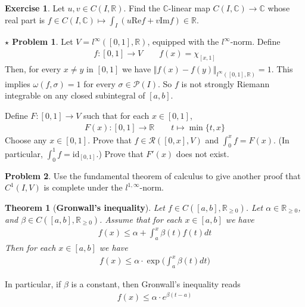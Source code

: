 \documentclass[12pt,b5paper,notitlepage]{article}
\theoremstyle{definition}
\newtheorem{exe}[df]{Exercise}
\newtheorem{prob}{\color{red}Problem}[section]
\newtheorem{sprob}[prob]{\color{red}$\star$ Problem}
\theoremstyle{plain}
\newtheorem{thm}[df]{Theorem}
\newcommand{\fk}{\mathfrak}
\newcommand{\mc}{\mathcal}
\newcommand{\id}{\mathrm{id}}
\newcommand{\scr}{\mathscr}
\newcommand{\Cbb}{\mathbb C}
\newcommand{\Rbb}{\mathbb R}
\newcommand{\Real}{\mathrm{Re}}
\newcommand{\Imag}{\mathrm{Im}}
\numberwithin{equation}{section}
\begin{document}
\begin{exe}
Let $u,v\in C(I,\Rbb)$. Find the $\Cbb$-linear map $C(I,\Cbb)\rightarrow\Cbb$ whose real part is $f\in C(I,\Cbb)\mapsto \int_I(u\Real f+v\Imag f)\in\Rbb$. 
\end{exe}



\begin{sprob}\label{lb389}
Let $V=l^\infty([0,1],\Rbb)$, equipped with the $l^\infty$-norm. Define 
\begin{align*}
f:[0,1]\rightarrow V\qquad f(x)=\chi_{[x,1]}
\end{align*}
Then, for every $x\neq y$ in $[0,1]$ we have $\Vert f(x)-f(y)\Vert_{l^\infty([0,1],\Rbb)}=1$. This implies $\omega(f,\sigma)=1$ for every $\sigma\in\mc P(I)$. So $f$ is not strongly Riemann integrable on any closed subintegral of $[a,b]$. 

Define $F:[0,1]\rightarrow V$ such that for each $x\in [0,1]$,
\begin{align*}
F(x):[0,1]\rightarrow\Rbb\qquad t\mapsto\min\{t,x\}
\end{align*}
Choose any $x\in[0,1]$. Prove that $f\in\scr R([0,x],V)$ and $\int_0^xf=F(x)$. (In particular, $\int_0^1f=\id_{[0,1]}$.) Prove that $F'(x)$ does not exist.  \hfill\qedsymbol
\end{sprob}

\begin{comment}
\begin{proof}[Hint]
To find $\int_0^1f$, for each $y\in\Rbb$, define $\varphi_y:V\rightarrow\Rbb$ by $\varphi_y(f)=f(y)$. Then $\varphi_y\in\fk L(V,\Rbb)$. Use $\varphi_y(\int_0^1f)=\int_0^1\varphi_y(f)$ to calculate $\int_0^1f$.
\end{proof}
\end{comment}



\begin{prob}
Use the fundamental theorem of calculus to give another proof that $C^1(I,V)$ is complete under the $l^{1,\infty}$-norm.
\end{prob}





\begin{thm}[\textbf{Gronwall's inequality}] 
Let $f\in C([a,b],\Rbb_{\geq0})$. Let $\alpha\in\Rbb_{\geq0}$, and $\beta\in C([a,b],\Rbb_{\geq0})$. Assume that for each $x\in[a,b]$ we have
\begin{align}
f(x)\leq  \alpha+\int_a^x\beta(t)f(t) dt  \label{eq160}
\end{align}
Then for each $x\in[a,b]$ we have
\begin{align}
f(x)\leq \alpha\cdot  \exp\Big(\int_a^x \beta(t)dt \Big)
\end{align}
\end{thm}
In particular, if $\beta$ is a constant, then Gronwall's inequality reads
\begin{align*}
f(x)\leq\alpha\cdot e^{\beta (t-a)}
\end{align*}
\end{document}
